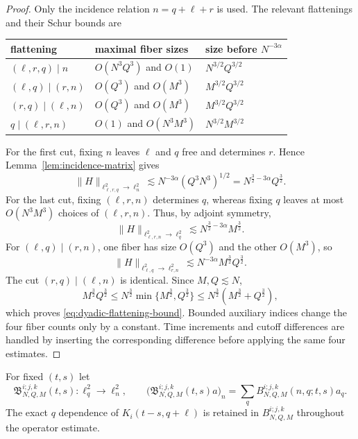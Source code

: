 \documentclass[10pt]{amsart}
\numberwithin{equation}{section}
\theoremstyle{plain}
\theoremstyle{definition}
\theoremstyle{remark}
\begin{document}
\begin{proof}
Only the incidence relation $n=q+\ell+r$ is used.  The relevant flattenings and their Schur bounds are
\begin{center}
\small
\begin{tabular}{@{}p{}p{}p{}@{}}
\toprule
flattening & maximal fiber sizes & size before $N^{-3\alpha}$ \\
\midrule
$(\ell,r,q)\mid n$ & $O(N^3Q^3)$ and $O(1)$ & $N^{3/2}Q^{3/2}$ \\
$(\ell,q)\mid(r,n)$ & $O(Q^3)$ and $O(M^3)$ & $M^{3/2}Q^{3/2}$ \\
$(r,q)\mid(\ell,n)$ & $O(Q^3)$ and $O(M^3)$ & $M^{3/2}Q^{3/2}$ \\
$q\mid(\ell,r,n)$ & $O(1)$ and $O(N^3M^3)$ & $N^{3/2}M^{3/2}$ \\
\bottomrule
\end{tabular}
\end{center}
For the first cut, fixing \(n\) leaves \(\ell\) and \(q\) free and determines \(r\).  Hence Lemma~\ref{lem:incidence-matrix} gives
\[
 \|H\|_{\ell^2_{\ell,r,q}\to\ell^2_n}
 \lesssim N^{-3\alpha}(Q^3N^3)^{1/2}
 =N^{\frac32-3\alpha}Q^{\frac32}.
\]
For the last cut, fixing \((\ell,r,n)\) determines \(q\), whereas fixing \(q\) leaves at most \(O(N^3M^3)\) choices of \((\ell,r,n)\).  Thus, by adjoint symmetry,
\[
 \|H\|_{\ell^2_{\ell,r,n}\to\ell^2_q}
 \lesssim N^{\frac32-3\alpha}M^{\frac32}.
\]
For \((\ell,q)\mid(r,n)\), one fiber has size \(O(Q^3)\) and the other \(O(M^3)\), so
\[
 \|H\|_{\ell^2_{\ell,q}\to\ell^2_{r,n}}
 \lesssim N^{-3\alpha}M^{\frac32}Q^{\frac32}.
\]
The cut \((r,q)\mid(\ell,n)\) is identical.  Since \(M,Q\lesssim N\),
\[
        M^{\frac32}Q^{\frac32}
        \le N^{\frac32}\min\{M^{\frac32},Q^{\frac32}\}
        \le N^{\frac32}(M^{\frac32}+Q^{\frac32}),
\]
which proves \eqref{eq:dyadic-flattening-bound}.  Bounded auxiliary indices change the four fiber counts only by a constant.  Time increments and cutoff differences are handled by inserting the corresponding difference before applying the same four estimates.
\end{proof}


For fixed $(t,s)$ let
\[
        \mathfrak B_{N,Q,M}^{i;j,k}(t,s):\ell^2_q\to\ell^2_n,
        \qquad
        \bigl(\mathfrak B_{N,Q,M}^{i;j,k}(t,s)a\bigr)_n
        =\sum_qB_{N,Q,M}^{i;j,k}(n,q;t,s)a_q.
\]
The exact $q$ dependence of $K_i(t-s,q+\ell)$ is retained in $B_{N,Q,M}^{i;j,k}$ throughout the operator estimate.
\end{document}
